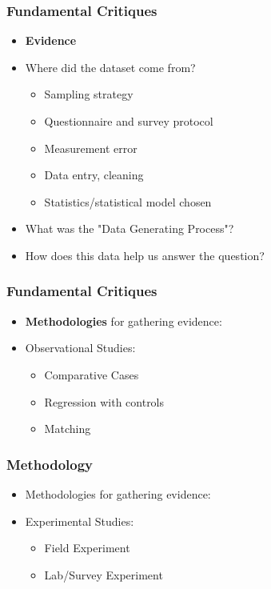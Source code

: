 \documentclass[xcolor=x11names,compress]{beamer}\usepackage[]{graphicx}\usepackage[]{color}
\renewcommand{\(}{\begin{columns}}
\renewcommand{\)}{\end{columns}}
\newcommand{\<}[1]{\begin{column}{#1}}
\renewcommand{\>}{\end{column}}
\begin{document}
\begin{frame}
\frametitle{Fundamental Critiques}
\begin{itemize}
\item \textbf{Evidence}
\pause
\item Where did the dataset come from?
\pause
\begin{itemize}
\item Sampling strategy
\pause
\item Questionnaire and survey protocol
\pause
\item Measurement error
\pause
\item Data entry, cleaning
\pause
\item Statistics/statistical model chosen
\pause
\end{itemize}
\item What was the "Data Generating Process"?
\item How does this data help us answer the question?
\end{itemize}
\end{frame}

\begin{frame}
\frametitle{Fundamental Critiques}
\begin{itemize}
\item \textbf{Methodologies} for gathering evidence:
\pause
\item Observational Studies:
\begin{itemize}
\item Comparative Cases
\pause
\item Regression with controls
\pause
\item Matching
\end{itemize}
\end{itemize}
\end{frame}

\begin{frame}
\frametitle{Methodology}
\begin{itemize}
\item Methodologies for gathering evidence:
\pause
\item Experimental Studies:
\pause
\begin{itemize}
\item Field Experiment
\pause
\item Lab/Survey Experiment
\end{itemize}
\end{itemize}
\end{frame}
\end{document}
